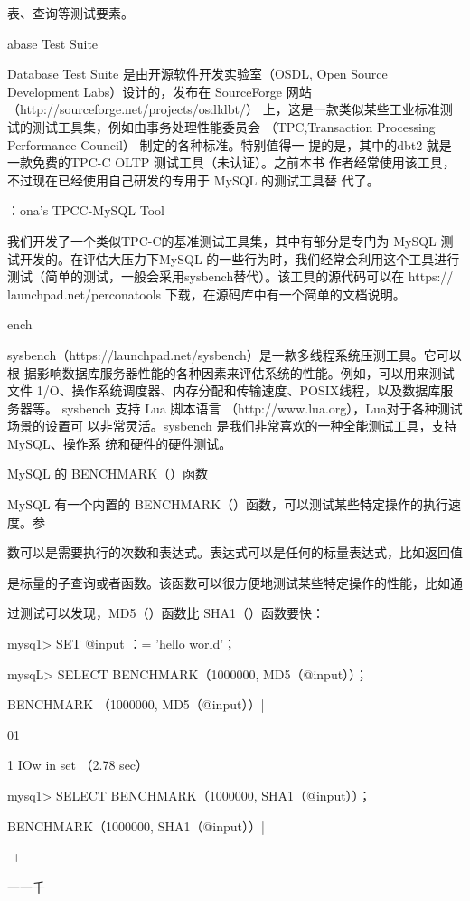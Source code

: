 表、查询等测试要素。

abase Test Suite

Database Test Suite 是由开源软件开发实验室（OSDL, Open Source Development
Labs）设计的，发布在 SourceForge 网站（http://sourceforge.net/projects/osdldbt/）
上，这是一款类似某些工业标准测试的测试工具集，例如由事务处理性能委员会
（TPC,Transaction Processing Performance Council） 制定的各种标准。特别值得一
提的是，其中的dbt2 就是一款免费的TPC-C OLTP 测试工具（未认证）。之前本书
作者经常使用该工具，不过现在已经使用自己研发的专用于 MySQL 的测试工具替
代了。

：ona's TPCC-MySQL Tool

我们开发了一个类似TPC-C的基准测试工具集，其中有部分是专门为 MySQL 测
试开发的。在评估大压力下MySQL 的一些行为时，我们经常会利用这个工具进行
测试（简单的测试，一般会采用sysbench替代）。该工具的源代码可以在 https://
launchpad.net/perconatools 下载，在源码库中有一个简单的文档说明。

ench

sysbench（https://launchpad.net/sysbench）是一款多线程系统压测工具。它可以根
据影响数据库服务器性能的各种因素来评估系统的性能。例如，可以用来测试文件
1/O、操作系统调度器、内存分配和传输速度、POSIX线程，以及数据库服务器等。
sysbench 支持 Lua 脚本语言 （http://www.lua.org），Lua对于各种测试场景的设置可
以非常灵活。sysbench 是我们非常喜欢的一种全能测试工具，支持 MySQL、操作系
统和硬件的硬件测试。

MySQL 的 BENCHMARK（）函数

MySQL 有一个内置的 BENCHMARK（）函数，可以测试某些特定操作的执行速度。参

数可以是需要执行的次数和表达式。表达式可以是任何的标量表达式，比如返回值

是标量的子查询或者函数。该函数可以很方便地测试某些特定操作的性能，比如通

过测试可以发现，MD5（）函数比 SHA1（）函数要快：

mysq1> SET @input ：= 'hello world'；

mysqL> SELECT BENCHMARK（1000000, MD5（@input））；

BENCHMARK （1000000, MD5（@input））|

01

1 IOw in set （2.78 sec）

mysq1> SELECT BENCHMARK（1000000, SHA1（@input））；

BENCHMARK（1000000, SHA1（@input））|

-+

一一千

